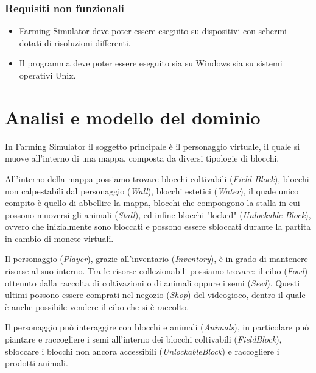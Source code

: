 \documentclass[a4paper,12pt]{report}
\begin{document}
\subsubsection{Requisiti non funzionali}
\begin{itemize}
	\item Farming Simulator deve poter essere eseguito su dispositivi con schermi dotati di risoluzioni differenti.
	\item Il programma deve poter essere eseguito sia su Windows sia su sistemi operativi Unix.
\end{itemize}

\hfill\break
\section{Analisi e modello del dominio}

In Farming Simulator il soggetto principale è il personaggio virtuale, il quale si muove all'interno di una mappa, composta da diversi tipologie di blocchi. 

All'interno della mappa possiamo trovare blocchi coltivabili (\textit{Field Block}), blocchi non calpestabili dal personaggio (\textit{Wall}), blocchi estetici (\textit{Water}), il quale unico compito è quello di abbellire la mappa, blocchi che compongono la stalla in cui possono muoversi gli animali (\textit{Stall}), ed infine blocchi "locked" (\textit{Unlockable Block}), ovvero che inizialmente sono bloccati e possono essere sbloccati durante la partita in cambio di monete virtuali.

Il personaggio (\textit{Player}), grazie all'inventario (\textit{Inventory}), è in grado di mantenere risorse al suo interno. Tra le risorse collezionabili possiamo trovare: il cibo (\textit{Food}) ottenuto dalla raccolta di coltivazioni o di animali oppure i semi (\textit{Seed}).
Questi ultimi possono essere comprati nel negozio (\textit{Shop}) del videogioco, dentro il quale è anche possibile vendere il cibo che si è raccolto.

Il personaggio può interaggire con blocchi e animali (\textit{Animals}), in particolare può piantare e raccogliere i semi all'interno dei blocchi coltivabili (\textit{FieldBlock}), sbloccare i blocchi non ancora accessibili (\textit{UnlockableBlock}) e raccogliere i prodotti animali.
\end{document}
